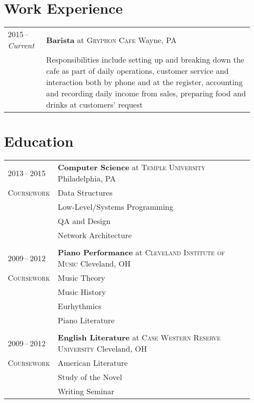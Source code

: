 \documentclass[a4paper,11pt]{article}
\begin{document}
\section{Work Experience}
\begin{tabularx}{\textwidth}{@{}p{6em}|X@{}}
    2015\,--\,\emph{Current} & \textbf{Barista} at \textsc{Gryphon Cafe} \hfill Wayne, PA \\
    & \footnotesize{Responsibilities include setting up and breaking down the cafe as part of daily operations, customer service and interaction both by phone and at the register, accounting and recording daily income from sales, preparing food and drinks at customers' request} \\
\end{tabularx}

\section{Education}
\begin{tabularx}{\textwidth}{@{}p{6em}|X@{}}
    2013\,--\,2015 & \textbf{Computer Science} at \textsc{Temple University} \hfill Philadelphia, PA \\
    \textsc{Coursework} & \footnotesize{Data Structures} \\
    & \footnotesize{Low-Level/Systems Programming} \\
    & \footnotesize{QA and Design} \\
    & \footnotesize{Network Architecture} \\
    \multicolumn{2}{c}{} \\
    2009\,--\,2012 & \textbf{Piano Performance} at \textsc{Cleveland Institute of Music} \hfill Cleveland, OH \\
    \textsc{Coursework} & \footnotesize{Music Theory} \\
    & \footnotesize{Music History} \\
    & \footnotesize{Eurhythmics} \\
    & \footnotesize{Piano Literature} \\
    \multicolumn{2}{c}{} \\
    2009\,--\,2012 & \textbf{English Literature} at \textsc{Case Western Reserve University} \hfill Cleveland, OH \\
    \textsc{Coursework} & \footnotesize{American Literature} \\
    & \footnotesize{Study of the Novel} \\
    & \footnotesize{Writing Seminar}
\end{tabularx}
\end{document}
